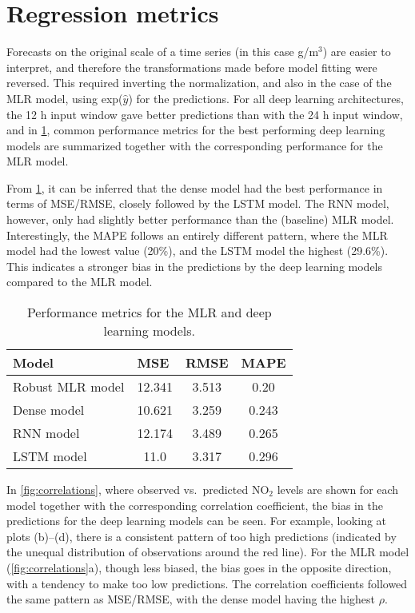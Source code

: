 
\section{Regression metrics}
Forecasts on the original scale of a time series (in this case \textmugreek g/m$^3$) are easier to interpret, and therefore the transformations made before model fitting were reversed. This required inverting the normalization, and also in the case of the MLR model, using exp($\hat{y}$) for the predictions. For all deep learning architectures, the 12 h input window gave better predictions than with the 24 h input window, and in \cref{tab:metrics}, common performance metrics for the best performing deep learning models are summarized together with the corresponding performance for the MLR model.

From \cref{tab:metrics}, it can be inferred that the dense model had the best performance in terms of MSE/RMSE, closely followed by the LSTM model. The RNN model, however, only had slightly better performance than the (baseline) MLR model. Interestingly, the MAPE follows an entirely different pattern, where the MLR model had the lowest value (20\%), and the LSTM model the highest (29.6\%). This indicates a stronger bias in the predictions by the deep learning models compared to the MLR model. 

\begin{table}[h]
\centering
\caption{Performance metrics for the MLR and deep learning models.}
\label{tab:metrics}
\begin{tabular}{@{}lccc@{}}
\toprule
Model            & \multicolumn{1}{l}{MSE} & \multicolumn{1}{l}{RMSE} & \multicolumn{1}{l}{MAPE} \\ \midrule
Robust MLR model & 12.341                  & 3.513                    & 0.20                     \\
Dense model      & 10.621                  & 3.259                    & 0.243                    \\
RNN model        & 12.174                  & 3.489                    & 0.265                    \\
LSTM model       & 11.0                    & 3.317                    & 0.296                    \\ \bottomrule
\end{tabular}
\end{table}

In \cref{fig:correlations}, where observed vs.\ predicted NO$_2$ levels are shown for each model together with the corresponding correlation coefficient, the bias in the predictions for the deep learning models can be seen. For example, looking at plots (b)--(d), there is a consistent pattern of too high predictions (indicated by the unequal distribution of observations around the red line). For the MLR model (\cref{fig:correlations}a), though less biased, the bias goes in the opposite direction, with a tendency to make too low predictions. The correlation coefficients followed the same pattern as MSE/RMSE, with the dense model having the highest $\rho$. 

